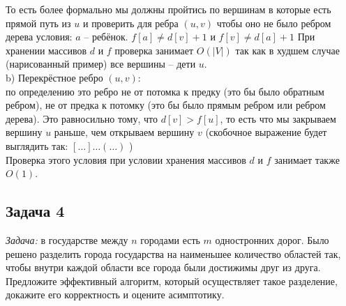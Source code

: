 \documentclass[a4paper,12pt]{article} %
\begin{document}
\begin{center}
\end{center}

То есть более формально мы должны пройтись по вершинам в которые есть прямой путь из $ u $ и проверить для ребра $ (u,v) $ чтобы оно не было ребром дерева условия: $ a $ -- ребёнок. $ f[a] \neq d[v]+1 $ и $ f[v] \neq d[a]+1 $
При хранении массивов $ d $ и $ f $ проверка занимает $ O(|V|) $ так как в худшем случае (нарисованный пример) все вершины -- дети $ u $.\\

b) Перекрёстное ребро $(u,v)$:\\
по определению это ребро не от потомка к предку (это бы было обратным ребром), не от предка к потомку (это бы было прямым ребром или ребром дерева). Это равносильно тому, что $ d[v] > f[u] $, то есть что мы закрываем вершину $ u $ раньше, чем открываем вершину $ v $ (скобочное выражение будет выглядить так: $ [ \ldots ] \ldots ( \ldots ) $ )\\
Проверка этого условия при условии хранения массивов $ d $ и $ f $ занимает также $ O(1) $.


\subsection*{Задача 4}
\textit{Задача:} в государстве между $n$ городами есть $m$ одностронних дорог. Было решено разделить города государства на наименьшее количество областей так, чтобы внутри каждой области все города были достижимы друг из друга.\\

Предложите эффективный алгоритм, который осуществляет такое разделение, докажите его корректность и оцените асимптотику.\\
\end{document}
